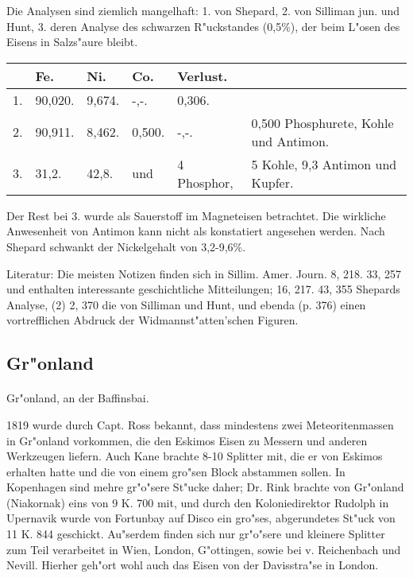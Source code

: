 \documentclass[a4paper, 11pt, oneside]{article}
\begin{document}
Die Analysen sind ziemlich mangelhaft: 1. von Shepard, 2. von Silliman jun. und Hunt, 3. deren Analyse des schwarzen R"uckstandes (0,5\%), der beim L"osen des Eisens in Salzs"aure bleibt.
\begin{table}[H]
    \centering
    \begin{tabular}{l l l l l p{40mm}}
         & Fe. & Ni. & Co. & Verlust. &  \\ \hline
        1. & 90,020. & 9,674. & -,-. & 0,306. &  \\
        2. & 90,911. & 8,462. & 0,500. & -,-. & 0,500 Phosphurete, Kohle und Antimon.  \\
        3. & 31,2. & 42,8. & und & 4 Phosphor, &  5 Kohle, 9,3 Antimon und Kupfer.  \\
    \end{tabular}
\end{table}

Der Rest bei 3. wurde als Sauerstoff im Magneteisen betrachtet. Die wirkliche Anwesenheit von Antimon kann nicht als konstatiert angesehen werden. Nach Shepard schwankt der Nickelgehalt von 3,2-9,6\%.

\footnotesize
Literatur: Die meisten Notizen finden sich in Sillim. Amer. Journ. 8, 218. 33, 257 und enthalten interessante geschichtliche Mitteilungen; 16, 217. 43, 355 Shepards Analyse, (2) 2, 370 die von Silliman und Hunt, und ebenda (p. 376) einen vortrefflichen Abdruck der Widmannst"atten'schen Figuren.

\subsection{Gr"onland}
\normalsize
\paragraph{}
Gr"onland, an der Baffinsbai.

1819 wurde durch Capt. Ross bekannt, dass mindestens zwei Meteoritenmassen in Gr"onland vorkommen, die den Eskimos Eisen zu Messern und anderen Werkzeugen liefern. Auch Kane brachte 8-10 Splitter mit, die er von Eskimos erhalten hatte und die von einem gro"sen Block abstammen sollen. In Kopenhagen sind mehre gr"o"sere St"ucke daher; Dr. Rink brachte von Gr"onland (Niakornak) eins von 9 K. 700 mit, und durch den Koloniedirektor Rudolph in Upernavik wurde von Fortunbay auf Disco ein gro"ses, abgerundetes St"uck von 11 K. 844 geschickt. Au"serdem finden sich nur gr"o"sere und kleinere Splitter zum Teil verarbeitet in Wien, London, G"ottingen, sowie bei v. Reichenbach und Nevill. Hierher geh"ort wohl auch das Eisen von der Davisstra"se in London.
\end{document}

